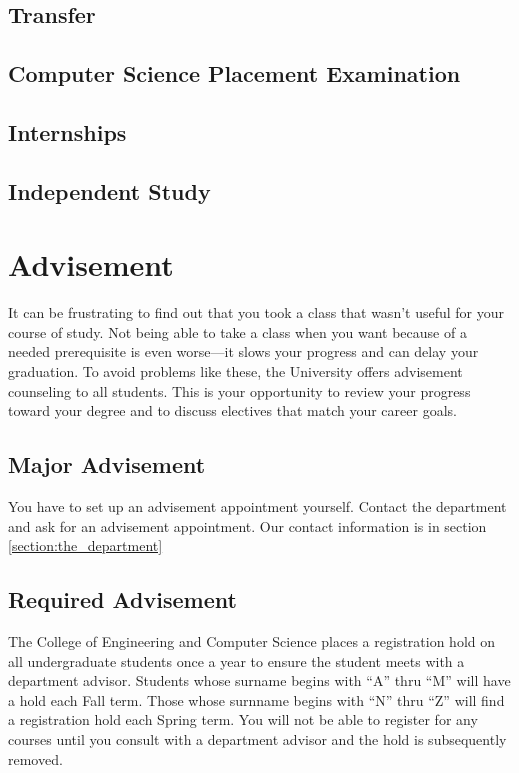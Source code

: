 \documentclass{book}
\begin{document}
\section{Transfer}

\section{Computer Science Placement Examination}

\section{Internships}

\section{Independent Study}

\chapter{Advisement}

It can be frustrating to find out that you took a class that wasn’t useful for your course of study. Not being able to take a class when you want because of a needed prerequisite is even worse---it slows your progress and can delay your graduation. To avoid problems like these, the University offers advisement counseling to all students. This is your opportunity to review your progress toward your degree and to discuss electives that match your career goals.

\section{Major Advisement}
You have to set up an advisement appointment yourself. Contact the department and ask for an advisement appointment. Our contact information is in section \ref{section:the_department}

\section{Required Advisement}
The College of Engineering and Computer Science places a registration hold on all undergraduate students once a year to ensure the student meets with a department advisor. Students whose surname begins with ``A'' thru ``M'' will have a hold each Fall term. Those whose surnname begins with ``N'' thru ``Z'' will find a registration hold each Spring term.  You will not be able to register for any courses until you consult with a department advisor and the hold is subsequently removed.
\end{document}

